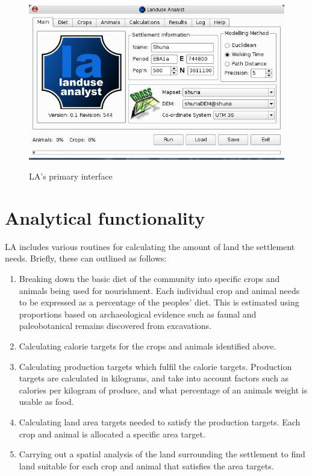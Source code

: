 \begin{figure}[htbp] %
  \includegraphics[scale=0.36]{./images/LanduseAnalyst544.jpg}
   \label{fig:la544} \caption{LA's primary interface}
   \end{figure}


\section{Analytical functionality} \label{sec:Analytical Functionality}

LA includes various routines for calculating the amount of land 
the settlement needs.  Briefly, these can outlined as follows:

  \begin{enumerate} 
  \item Breaking down the basic diet of the community into specific crops and
  animals being used for nourishment.  Each individual crop and animal needs to
  be expressed as a percentage of the peoples' diet.  This is estimated using
  proportions based on archaeological evidence such as faunal and
  paleobotanical remains discovered from excavations.  
  \item Calculating  calorie targets for the crops and animals identified above.
 
  \item Calculating production targets which fulfil the calorie targets.
  Production targets are calculated in kilograms, and take into account factors
such as 
  calories per kilogram of produce, and what percentage of an animals weight is
  usable as food.  
  \item Calculating land area targets needed to satisfy the
  production targets.  Each crop and animal is allocated a specific area
  target.  
  \item Carrying out a spatial analysis of the land surrounding the settlement
to
  find land suitable for each crop and animal that satisfies the area targets.  
  \end{enumerate}

